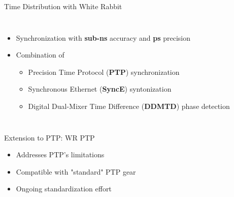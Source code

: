 \documentclass[compress,red]{beamer}
\begin{document}
\begin{frame}{Time Distribution with White Rabbit}

\begin{columns}[c]

  \begin{itemize}
    \item Synchronization with {\bf sub-ns} accuracy and {\bf ps} precision
    \item Combination of
	\begin{itemize}\small
	  \item Precision Time Protocol ({\bf PTP}) synchronization
	  \item Synchronous Ethernet ({\bf SyncE}) syntonization
	  \item Digital Dual-Mixer Time Difference ({\bf DDMTD}) phase detection
	\end{itemize}
  \end{itemize}
  \begin{center}
  \vspace{6.9cm}
\hspace{2cm}

  \end{center}  
\end{columns}

\end{frame}
\begin{frame}{Extension to PTP: WR PTP}
	\begin{itemize}
	  \item Addresses PTP's limitations
	  \item Compatible with "standard" PTP gear
	  \item Ongoing standardization effort
	\end{itemize}
\end{frame}
\end{document}
